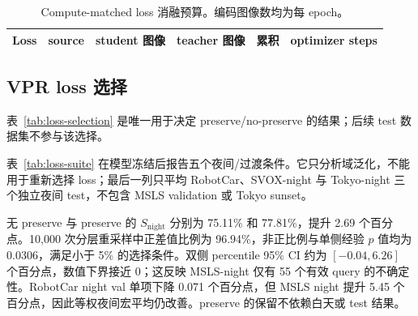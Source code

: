 \documentclass[UTF8,a4paper,11pt]{ctexart}
\begin{document}
\begin{table}[htbp]
\centering
\caption{Compute-matched loss 消融预算。编码图像数均为每 epoch。}
\label{tab:compute-matching}
\begin{tabular}{lrrrrr}
\toprule
Loss & source & student 图像 & teacher 图像 & 累积 & optimizer steps\\
\midrule

\end{tabular}
\end{table}

\subsection{VPR loss 选择}
表~\ref{tab:loss-selection} 是唯一用于决定 preserve/no-preserve 的结果；后续 test 数据集不参与该选择。
\begin{table}[htbp]
\centering
\caption{夜间优先的 loss 选择（R@1，\%）。单侧 $p$ 为 10,000 次分层 paired bootstrap 中非正差值的比例。}
\label{tab:loss-selection}
\end{table}

表~\ref{tab:loss-suite} 在模型冻结后报告五个夜间/过渡条件。它只分析域泛化，不能用于重新选择 loss；最后一列只平均 RobotCar、SVOX-night 与 Tokyo-night 三个独立夜间 test，不包含 MSLS validation 或 Tokyo sunset。
\begin{table}[htbp]
\centering
\caption{四种 VPR loss 的冻结 R@1（\%）。MSLS 为 validation，Tokyo-S 为 transition。}
\label{tab:loss-suite}
\end{table}

无 preserve 与 preserve 的 $S_{\mathrm{night}}$ 分别为 75.11\% 和 77.81\%，提升 2.69 个百分点。10,000 次分层重采样中正差值比例为 96.94\%，非正比例与单侧经验 $p$ 值均为 0.0306，满足小于 5\% 的选择条件。双侧 percentile 95\% CI 约为 $[-0.04,6.26]$ 个百分点，数值下界接近 0；这反映 MSLS-night 仅有 55 个有效 query 的不确定性。RobotCar night val 单项下降 0.071 个百分点，但 MSLS night 提升 5.45 个百分点，因此等权夜间宏平均仍改善。preserve 的保留不依赖白天或 test 结果。
\end{document}
